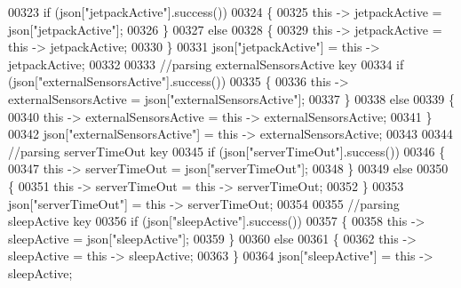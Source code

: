 \begin{DoxyCode}
00323             \textcolor{keywordflow}{if} (json[\textcolor{stringliteral}{"jetpackActive"}].success())
00324             \{
00325                 \textcolor{keyword}{this} -> jetpackActive = json[\textcolor{stringliteral}{"jetpackActive"}];
00326             \}
00327             \textcolor{keywordflow}{else}
00328             \{
00329                 \textcolor{keyword}{this} -> jetpackActive = \textcolor{keyword}{this} -> jetpackActive;
00330             \}
00331             json[\textcolor{stringliteral}{"jetpackActive"}] = \textcolor{keyword}{this} -> jetpackActive;
00332 
00333             \textcolor{comment}{//parsing externalSensorsActive key}
00334             \textcolor{keywordflow}{if} (json[\textcolor{stringliteral}{"externalSensorsActive"}].success())
00335             \{
00336                 \textcolor{keyword}{this} -> externalSensorsActive = json[\textcolor{stringliteral}{"externalSensorsActive"}];
00337             \}
00338             \textcolor{keywordflow}{else}
00339             \{
00340                 \textcolor{keyword}{this} -> externalSensorsActive = \textcolor{keyword}{this} -> externalSensorsActive;
00341             \}
00342             json[\textcolor{stringliteral}{"externalSensorsActive"}] = \textcolor{keyword}{this} -> externalSensorsActive;
00343 
00344             \textcolor{comment}{//parsing serverTimeOut key}
00345             \textcolor{keywordflow}{if} (json[\textcolor{stringliteral}{"serverTimeOut"}].success())
00346             \{
00347                 \textcolor{keyword}{this} -> serverTimeOut = json[\textcolor{stringliteral}{"serverTimeOut"}];
00348             \}
00349             \textcolor{keywordflow}{else}
00350             \{
00351                 \textcolor{keyword}{this} -> serverTimeOut = \textcolor{keyword}{this} -> serverTimeOut;
00352             \}
00353             json[\textcolor{stringliteral}{"serverTimeOut"}] = \textcolor{keyword}{this} -> serverTimeOut;
00354             
00355             \textcolor{comment}{//parsing sleepActive key}
00356             \textcolor{keywordflow}{if} (json[\textcolor{stringliteral}{"sleepActive"}].success())
00357             \{
00358                 \textcolor{keyword}{this} -> sleepActive = json[\textcolor{stringliteral}{"sleepActive"}];
00359             \}
00360             \textcolor{keywordflow}{else}
00361             \{
00362                 \textcolor{keyword}{this} -> sleepActive = \textcolor{keyword}{this} -> sleepActive;
00363             \}
00364             json[\textcolor{stringliteral}{"sleepActive"}] = \textcolor{keyword}{this} -> sleepActive;

\end{DoxyCode}

